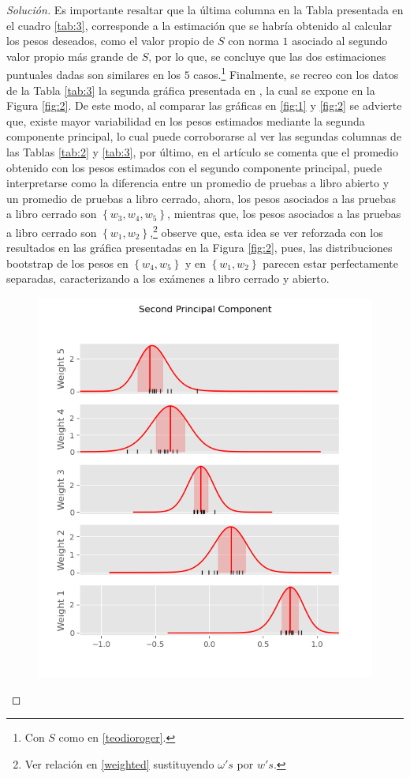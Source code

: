 \documentclass[10.5pt,notitlepage]{article}
\newenvironment{solucion}
  {\begin{proof}[Solución]}
  {\end{proof}}
\newcommand{\kis}[1]{\left\{ #1 \right\}}
\theoremstyle{plain}
\begin{document}
\begin{solucion}
Es importante resaltar que la última columna en la Tabla presentada en el cuadro \ref{tab:3}, corresponde a la estimación que se habría obtenido al calcular los pesos deseados, como el valor propio de \(S\) con norma \(1\) asociado al segundo valor propio más grande de \(S\), por lo que, se concluye que las dos estimaciones puntuales dadas son similares en los \(5\) casos.\footnote{Con \(S\) como en \eqref{teodioroger}.} Finalmente, se recreo con los datos de la Tabla \ref{tab:3} la segunda gráfica presentada en \textcite{diaconis_computer-intensive_1983}, la cual se expone en la Figura \ref{fig:2}. De este modo, al comparar las gráficas en \ref{fig:1} y \ref{fig:2} se advierte que, existe mayor variabilidad en los pesos estimados mediante la segunda componente principal, lo cual puede corroborarse al ver las segundas columnas de las Tablas \ref{tab:2} y \ref{tab:3}, por último, en el artículo se comenta que el promedio obtenido con los pesos estimados con el segundo componente principal, puede interpretarse como la diferencia entre un promedio de pruebas a libro abierto y un promedio de pruebas a libro cerrado, ahora, los pesos asociados a las pruebas a libro cerrado son \(\kis{w_3, w_4, w_5}\), mientras que, los pesos asociados a las pruebas a libro cerrado son \(\kis{w_1, w_2}\),\footnote{Ver relación en \eqref{weighted} sustituyendo \(\omega's\) por \(w's\).} observe que, esta idea se ver reforzada con los resultados en las gráfica presentadas en la Figura \ref{fig:2}, pues, las distribuciones bootstrap de los pesos en \(\kis{w_4, w_5}\) y en \(\kis{w_1, w_2}\) parecen estar perfectamente separadas, caracterizando a los exámenes a libro cerrado y abierto.
\begin{figure}[htb]
    \centering
    \includegraphics[scale = 0.5]{Figure_16.png}

\end{figure}
\end{solucion}
\end{document}
